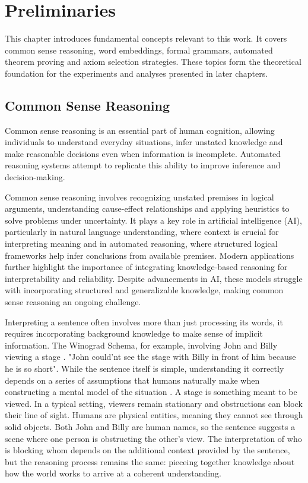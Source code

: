 \documentclass[english,version-2020-11]{uzl-thesis}
\begin{document}

\chapter{Preliminaries}
\label{chapter-preliminaries}

This chapter introduces fundamental concepts relevant to this work. It covers common sense reasoning, word embeddings, formal grammars, automated theorem proving and axiom selection strategies. These topics form the theoretical foundation for the experiments and analyses presented in later chapters.

\section{Common Sense Reasoning}

Common sense reasoning is an essential part of human cognition, allowing individuals to understand everyday situations, infer unstated knowledge and make reasonable decisions even when information is incomplete. Automated reasoning systems attempt to replicate this ability to improve inference and decision-making.

Common sense reasoning involves recognizing unstated premises in logical arguments, understanding cause-effect relationships and applying heuristics to solve problems under uncertainty. It plays a key role in artificial intelligence (AI), particularly in natural language understanding, where context is crucial for interpreting meaning and in automated reasoning, where structured logical frameworks help infer conclusions from available premises. Modern applications further highlight the importance of integrating knowledge-based reasoning for interpretability and reliability. Despite advancements in AI, these models struggle with incorporating structured and generalizable knowledge, making common sense reasoning an ongoing challenge.

Interpreting a sentence often involves more than just processing its words, it requires incorporating background knowledge to make sense of implicit information. The Winograd Schema, for example, involving John and Billy viewing a stage \cite{Levesque2012}. 
"John could'nt see the stage with Billy in front of him because he is so short".
While the sentence itself is simple, understanding it correctly depends on a series of assumptions that humans naturally make when constructing a mental model of the situation \cite{Bayerkuhnlein2023}. A stage is something meant to be viewed. In a typical setting, viewers remain stationary and obstructions can block their line of sight. Humans are physical entities, meaning they cannot see through solid objects. Both John and Billy are human names, so the sentence suggests a scene where one person is obstructing the other’s view. The interpretation of who is blocking whom depends on the additional context provided by the sentence, but the reasoning process remains the same: pieceing together knowledge about how the world works to arrive at a coherent understanding.
\end{document}
